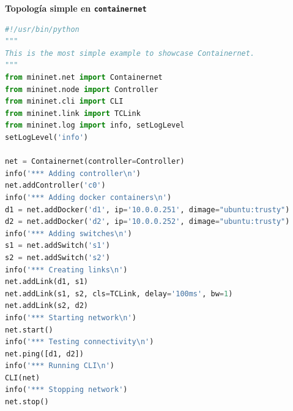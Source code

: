 \documentclass[12pt]{article}
\begin{document}
	\vspace{20px}
	\noindent \textbf{\large Topología simple en \texttt{containernet}}\\
		\begin{lstlisting}[language=Python, caption={Código topologia simple en \texttt{containernet} (\texttt{containernet\_example.py})}, label={lst: topo simple containernet}]
#!/usr/bin/python
"""
This is the most simple example to showcase Containernet.
"""
from mininet.net import Containernet
from mininet.node import Controller
from mininet.cli import CLI
from mininet.link import TCLink
from mininet.log import info, setLogLevel
setLogLevel('info')
		
net = Containernet(controller=Controller)
info('*** Adding controller\n')
net.addController('c0')
info('*** Adding docker containers\n')
d1 = net.addDocker('d1', ip='10.0.0.251', dimage="ubuntu:trusty")
d2 = net.addDocker('d2', ip='10.0.0.252', dimage="ubuntu:trusty")
info('*** Adding switches\n')
s1 = net.addSwitch('s1')
s2 = net.addSwitch('s2')
info('*** Creating links\n')
net.addLink(d1, s1)
net.addLink(s1, s2, cls=TCLink, delay='100ms', bw=1)
net.addLink(s2, d2)
info('*** Starting network\n')
net.start()
info('*** Testing connectivity\n')
net.ping([d1, d2])
info('*** Running CLI\n')
CLI(net)
info('*** Stopping network')
net.stop()
	\end{lstlisting}
	
	
\end{document}
